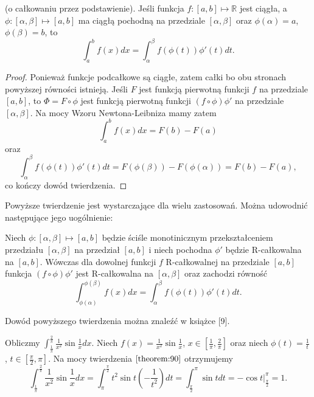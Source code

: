 \documentclass[leqno]{article}
\begin{document}
\begin{justify}
\begin{theorem}
{
    (o całkowaniu przez podstawienie). Jeśli funkcja $f : [a,b] \mapsto \mathbb{R}$ jest ciągła, a $\phi : [\alpha, \beta] \mapsto [a,b]$ ma ciągłą
    pochodną na przedziale $[\alpha, \beta]$ oraz $\phi(\alpha) = a$, $\phi(\beta) = b$, to
    \[
        \int_{a}^{b}f(x)dx = \int_{\alpha}^{\beta}f(\phi(t))\phi'(t)dt.
    \]
}
\end{theorem}
\begin{proof}
    Ponieważ funkcje podcałkowe są ciągłe, zatem całki bo obu stronach powyższej równości istnieją.
    Jeśli $F$ jest funkcją pierwotną funkcji $f$ na przedziale $[a,b]$, to $\Phi = F \circ \phi$ jest funkcją pierwotną funkcji
    $(f \circ \phi)\phi'$ na przedziale $[\alpha, \beta]$. Na mocy Wzoru Newtona-Leibniza mamy zatem
    \[
        \int_{a}^{b}f(x)dx = F(b) - F(a) 
    \]
    oraz
    \[
        \int_{\alpha}^{\beta}f(\phi(t))\phi'(t)dt = F(\phi(\beta)) - F(\phi(\alpha)) = F(b) - F(a),
    \]
    co kończy dowód twierdzenia.
\end{proof}

Powyższe twierdzenie jest wystarczające dla wielu zastosowań. Można udowodnić następujące jego uogólnienie:

\begin{theorem}
{
    Niech $\phi : [\alpha, \beta] \mapsto [a,b]$ będzie ściśle monotinicznym przekształceniem przedziału
    $[\alpha, \beta]$ na przedział $[a,b]$ i niech pochodna $\phi'$ będzie R-całkowalna na $[a,b]$. Wówczas dla dowolnej funkcji $f$ R-całkowalnej
    na przedziale $[a,b]$ funkcja $(f \circ \phi)\phi'$ jest R-całkowalna na $[\alpha, \beta]$ oraz zachodzi równość
    \[
        \int_{\phi(\alpha)}^{\phi(\beta)}f(x)dx = \int_{\alpha}^{\beta}f(\phi(t))\phi'(t)dt.
    \]
}
\end{theorem}

Dowód powyższego twierdzenia można znaleźć w książce [9].

\begin{ex}
    Obliczmy $\int_{\frac{1}{\pi}}^{\frac{2}{\pi}}\frac{1}{x^2}\sin \frac{1}{x}dx$. Niech $f(x) = \frac{1}{x^2}\sin \frac{1}{x}$, $x \in [\frac{1}{\pi}, \frac{2}{\pi}]$
    oraz niech $\phi(t) = \frac{1}{t}$, $t \in [\frac{\pi}{2}, \pi]$. Na mocy twierdzenia $\ref{theorem:90}$ otrzymujemy
    \[
        \int_{\frac{1}{\pi}}^{\frac{2}{\pi}}\frac{1}{x^2}\sin \frac{1}{x}dx = 
        \int_{\pi}^{\frac{\pi}{2}}t^2 \sin t(-\frac{1}{t^2})dt = 
        \int_{\frac{\pi}{2}}^{\pi}\sin t dt = -\cos t \big|_{\frac{\pi}{2}}^{\pi} = 1.
    \]
\end{ex}


\end{justify}
\end{document}
